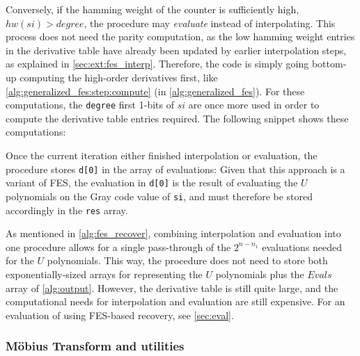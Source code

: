 Conversely, if the hamming weight of the counter is sufficiently high, $hw(si) > degree$, the procedure may \textit{evaluate} instead of interpolating. This process does not need the parity computation, as the low hamming weight entries in the derivative table have already been updated by earlier interpolation steps, as explained in \cref{sec:ext:fes_interp}. Therefore, the code is simply going bottom-up computing the high-order derivatives first, like \cref{alg:generalized_fes:step:compute} (in \cref{alg:generalized_fes}). For these computations, the \texttt{degree} first 1-bits of $si$ are once more used in order to compute the derivative table entries required. The following snippet shows these computations:

Once the current iteration either finished interpolation or evaluation, the procedure stores \texttt{d[0]} in the array of evaluations:
Given that this approach is a variant of FES, the evaluation in \texttt{d[0]} is the result of evaluating the $U$ polynomials on the Gray code value of \texttt{si}, and must therefore be stored accordingly in the \texttt{res} array.

As mentioned in \cref{alg:fes_recover}, combining interpolation and evaluation into one procedure allows for a single pass-through of the $2^{n - n_1}$ evaluations needed for the $U$ polynomials. This way, the procedure does not need to store both exponentially-sized arrays for representing the $U$ polynomials plus the $Evals$ array of \cref{alg:output}. However, the derivative table is still quite large, and the computational needs for interpolation and evaluation are still expensive. For an evaluation of using FES-based recovery, see \cref{sec:eval}.

\subsubsection{Möbius Transform and utilities}
